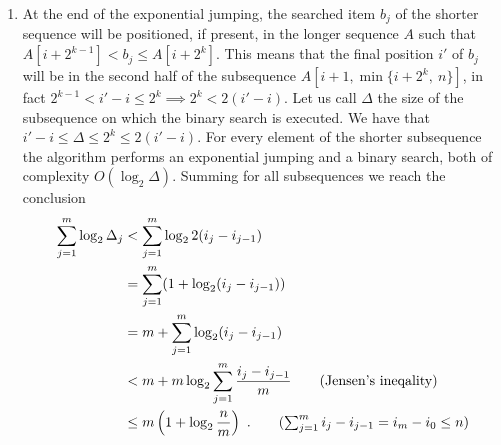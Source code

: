 \begin{enumerate}
  \item At the end of the exponential jumping, the searched item $b_j$ of the
  shorter sequence will be positioned, if present, in the longer sequence $A$
  such that $A[i + 2^{k-1}] < b_j \le A[i + 2^k]$. This means that the final
  position $i'$ of $b_j$ will be in the second half of the subsequence $A[i + 1,
  \min\{ i + 2^k,\ n\}]$, in fact $2^{k-1} < i' - i \le 2^k \implies 2^k < 2(i'
  - i)$. Let us call $\Delta$ the size of the subsequence on which the binary
  search is executed. We have that $i' - i \le \Delta \le 2^k \le 2(i' - i)$.
  For every element of the shorter subsequence the algorithm performs an
  exponential jumping and a binary search, both of complexity $O(\log_2\Delta)$.
  Summing for all subsequences we reach the conclusion
  \begin{align*}
       \sum_{j=1}^m \log_2\Delta_j &< \sum_{j=1}^m \log_2 2(i_j - i_{j-1}) \\
    &= \sum_{j=1}^m (1 + \log_2 (i_j - i_{j-1})) \\
    &= m + \sum_{j=1}^m \log_2 (i_j - i_{j-1}) \\
    &< m + m\log_2 \sum_{j=1}^m \frac{i_j - i_{j-1}}{m} \tag{Jensen's ineqality} \\
    &\le m\left(1 + \log_2\frac{n}{m}\right)\ . \tag{$\sum_{j=1}^m i_j - i_{j-1} = i_m - i_0 \le n$}
  \end{align*}

\end{enumerate}
